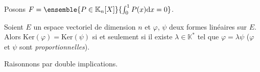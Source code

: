 \documentclass[french,11pt,twoside]{VcCours}
\newcommand{\dx}{\text{d}x}
\begin{document}
\begin{Exemple} Posons $F = \ensemble{P \in \mathbb{K}_n[X]}{\int_{0}^1 P(x) \dx =0}$.


\vspace{5cm}
\end{Exemple}

\begin{Proposition}{} Soient $E$ un espace vectoriel de dimension $n$ et $\varphi$, $\psi$ deux formes linéaires sur $E$. Alors $\textrm{Ker}(\varphi) = \textrm{Ker}(\psi)$ si et seulement si il existe $\lambda \in \mathbb{K}^*$ tel que $\varphi = \lambda \psi$ ($\varphi$ et $\psi$ sont \emph{proportionnelles}).
\end{Proposition}

\begin{Demonstration}{} Raisonnons par double implications.

\vspace{11cm}
%
%

\end{Demonstration}
\end{document}
